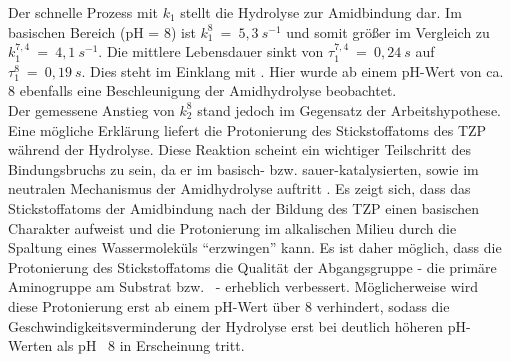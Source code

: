 Der schnelle Prozess mit $k_1$ stellt die Hydrolyse zur Amidbindung dar. Im basischen Bereich (pH = 8) ist $k_1^8~=~5,3~s^{-1}$ und somit größer im Vergleich zu $k_1^{7,4}~=~4,1~s^{-1}$. Die mittlere Lebensdauer sinkt von $\tau_1^{7,4}~=~0,24~s$ auf $\tau_1^8~=~0,19~s$. Dies steht im Einklang mit \cite{Smith.1998,Bundgaard.1991,Song.2000}. Hier wurde ab einem pH-Wert von ca. 8 ebenfalls eine Beschleunigung der Amidhydrolyse beobachtet. \\
Der gemessene Anstieg von $k_2^8$ stand jedoch im Gegensatz der Arbeitshypothese. Eine mögliche Erklärung liefert die Protonierung des Stickstoffatoms des \ac{TZP} während der Hydrolyse. Diese Reaktion scheint ein wichtiger Teilschritt des Bindungsbruchs zu sein, da er im basisch- bzw. sauer-katalysierten, sowie im neutralen Mechanismus der Amidhydrolyse auftritt  \cite{Zahn.2003,Zahn.2004,Zahn.2004b}. Es zeigt sich, dass das Stickstoffatoms der Amidbindung nach der Bildung des \ac{TZP} einen basischen Charakter aufweist und die Protonierung im alkalischen Milieu durch die Spaltung eines Wassermoleküls \enquote{erzwingen} kann. Es ist daher möglich, dass die Protonierung des Stickstoffatoms die Qualität der Abgangsgruppe - die primäre Aminogruppe am Substrat bzw. \spitze~- erheblich verbessert. Möglicherweise wird diese Protonierung erst ab einem pH-Wert über 8 verhindert, sodass die Geschwindigkeitsverminderung  der Hydrolyse erst bei deutlich höheren pH-Werten als pH~	8 in Erscheinung tritt.\\

\renewcommand{\noteOne}{Unter der Voraussetzung der mehrfach angebundenen \spacer~nach \abb~\ref{fig:multiple_bonding}.}

\renewcommand{\noteTwo}{In den Standard Kopplungsprotokollen werden i.a. Konzentration der zu koppelnden Verbindungen im mM Bereich verwendet. So z.B. in den Arbeiten von J.M. Nico \textit{et al.} \cite{Fischer.2010} oder Y. Nojima \textit{et al.} \cite{Nojima.2009}.}

\renewcommand{\noteThree}{Die Bildung der Amidbindung über die Aminolyse der \ac{NHS}-Ester läuft analog zur Rückreaktion der Amidhydrolyse \cite[10828]{Montalbetti.2005}.}

